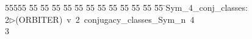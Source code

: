 %
%
\begin{tabbing}
55555 \= 55 \= 55 \= 55 \= 55 \= 55 \= 55 \= 55 \= 55 \= 55 \= 55 \= 55 \= 55 \= \>Sym\_4\_conj\_classes:\\[0pt]
2\>$\triangleright$\>(ORBITER)\ v\ 2\ conjugacy\_classes\_Sym\_n\ 4\\[0pt]
3\>\end{tabbing}
